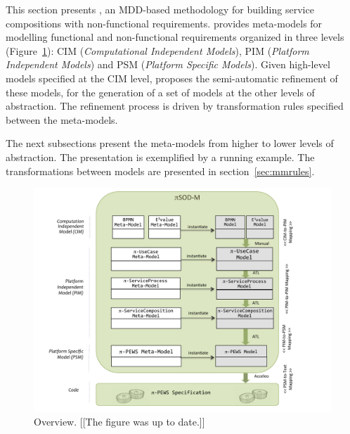 
This section presents \pisodm, an MDD-based methodology for building service compositions with non-functional requirements. 
\pisodm provides meta-models for modelling functional and non-functional requirements organized in three levels (Figure~\ref{fig:piSOD-M}): CIM (\textit{Computational Independent Models}), PIM (\textit{Platform Independent Models}) and PSM (\textit{Platform Specific Models}). 
Given  high-level models specified at the CIM level, \pisodm proposes the semi-automatic refinement of these models, for the generation of a set of models at the other levels of abstraction.
The refinement process is driven by transformation rules specified between the meta-models.

The next subsections present the meta-models from higher to lower levels of abstraction.
The presentation is exemplified by a running example.
The transformations between models are presented in section~\ref{sec:mmrules}.

\begin{figure}[h]
\centering
\includegraphics[width=1.0\textwidth]{figs/piSOD-M_process.pdf}
\caption{\pisodm Overview. {\color{blue}[[The figure was up to date.]]}}
\label{fig:piSOD-M}
\end{figure}



